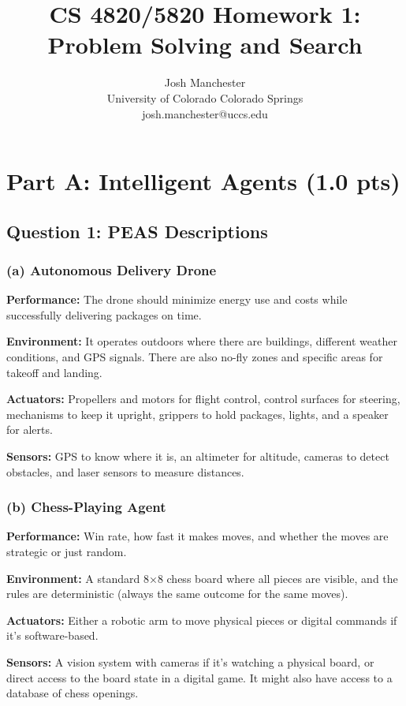 \documentclass[letterpaper]{article}
\title{CS 4820/5820 Homework 1: Problem Solving and Search}
\author{Josh Manchester\\
University of Colorado Colorado Springs\\
josh.manchester@uccs.edu}
\begin{document}
\maketitle

\section{Part A: Intelligent Agents (1.0 pts)}

\subsection{Question 1: PEAS Descriptions}

\subsubsection{(a) Autonomous Delivery Drone}

\textbf{Performance:} The drone should minimize energy use and costs while successfully delivering packages on time.

\textbf{Environment:} It operates outdoors where there are buildings, different weather conditions, and GPS signals. There are also no-fly zones and specific areas for takeoff and landing.

\textbf{Actuators:} Propellers and motors for flight control, control surfaces for steering, mechanisms to keep it upright, grippers to hold packages, lights, and a speaker for alerts.

\textbf{Sensors:} GPS to know where it is, an altimeter for altitude, cameras to detect obstacles, and laser sensors to measure distances.

\subsubsection{(b) Chess-Playing Agent}

\textbf{Performance:} Win rate, how fast it makes moves, and whether the moves are strategic or just random.

\textbf{Environment:} A standard 8×8 chess board where all pieces are visible, and the rules are deterministic (always the same outcome for the same moves).

\textbf{Actuators:} Either a robotic arm to move physical pieces or digital commands if it's software-based.

\textbf{Sensors:} A vision system with cameras if it's watching a physical board, or direct access to the board state in a digital game. It might also have access to a database of chess openings.
\end{document}
